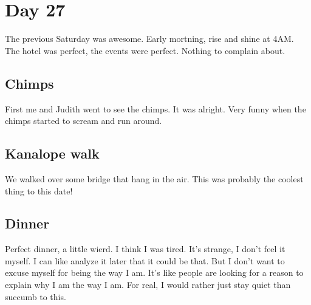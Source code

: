 \section{Day 27}
The previous Saturday was awesome. Early mortning, rise and shine at 4AM. 
The hotel was perfect, the events were perfect.
Nothing to complain about.
\subsection{Chimps}
First me and Judith went to see the chimps.
It was alright. Very funny when the chimps started to scream and run around.
\subsection{Kanalope walk}
We walked over some bridge that hang in the air.
This was probably the coolest thing to this date!
\subsection{Dinner}
Perfect dinner, a little wierd. I think I was tired. It's strange, I don't feel it myself.
I can like analyze it later that it could be that. But I don't want to excuse myself for being the way I am. It's like people are looking for a reason to explain why I am the way I am.
For real, I would rather just stay quiet than succumb to this.
